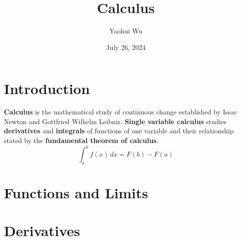\documentclass[12pt]{article}
\title{Calculus}
\author{Yaohui Wu}
\date{July 26, 2024}
\begin{document}
\maketitle

\section*{Introduction}
\textbf{Calculus} is the mathematical study of continuous change established
by Issac Newton and Gottfried Wilhelm Leibniz.
\textbf{Single variable calculus} studies \textbf{derivatives} and
\textbf{integrals} of functions of one variable and their relationship stated
by the \textbf{fundamental theorem of calculus}.
\[\int_a^b f(x)\,dx=F(b)-F(a)\]

\tableofcontents
\newpage

\section{Functions and Limits}






\section{Derivatives}









% 

% 
% 
% 
% 
\end{document}

